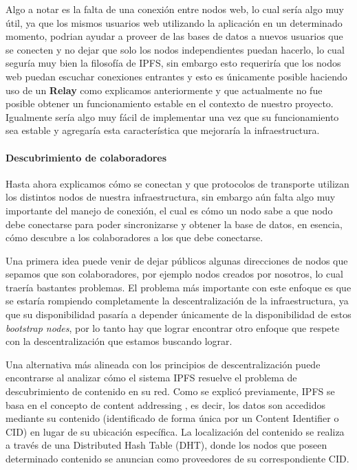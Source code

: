 Algo a notar es la falta de una conexión entre nodos web, lo cual sería algo muy útil, ya que los mismos usuarios web utilizando la aplicación en un determinado momento, podrian ayudar a proveer de las bases de datos a nuevos usuarios que se conecten y no dejar que solo los nodos independientes puedan hacerlo, lo cual seguría muy bien la filosofía de IPFS, sin embargo esto requeriría que los nodos web puedan escuchar conexiones entrantes y esto es únicamente posible haciendo uso de un \textbf{Relay} como explicamos anteriormente y que actualmente no fue posible obtener un funcionamiento estable en el contexto de nuestro proyecto. Igualmente sería algo muy fácil de implementar una vez que su funcionamiento sea estable y agregaría esta característica que mejoraría la infraestructura.

\paragraph{Descubrimiento de colaboradores}

Hasta ahora explicamos cómo se conectan y que protocolos de transporte utilizan los distintos nodos de nuestra infraestructura, sin embargo aún falta algo muy importante del manejo de conexión, el cual es cómo un nodo sabe a que nodo debe conectarse para poder sincronizarse y obtener la base de datos, en esencia, cómo descubre a los colaboradores a los que debe conectarse.

Una primera idea puede venir de dejar públicos algunas direcciones de nodos que sepamos que son colaboradores, por ejemplo nodos creados por nosotros, lo cual traería bastantes problemas. El problema más importante con este enfoque es que se estaría rompiendo completamente la descentralización de la infraestructura, ya que su disponibilidad pasaría a depender únicamente de la disponibilidad de estos \textit{bootstrap nodes}, por lo tanto hay que lograr encontrar otro enfoque que respete con la descentralización que estamos buscando lograr.

Una alternativa más alineada con los principios de descentralización puede encontrarse al analizar cómo el sistema IPFS resuelve el problema de descubrimiento de contenido en su red. Como se explicó previamente, IPFS se basa en el concepto de content addressing \cite{content-addressing}, es decir, los datos son accedidos mediante su contenido (identificado de forma única por un Content Identifier o CID) en lugar de su ubicación específica. La localización del contenido se realiza a través de una Distributed Hash Table (DHT), donde los nodos que poseen determinado contenido se anuncian como proveedores de su correspondiente CID.

